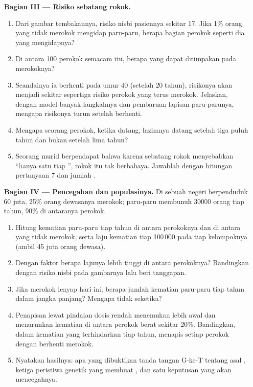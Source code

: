 \begin{problem}
\medskip
\noindent\textbf{Bagian III --- Risiko sebatang rokok.}
\begin{enumerate}[resume]
  \item Dari gambar tembakaunya, risiko nisbi pasiennya sekitar 17.
        Jika 1\% orang yang tidak merokok mengidap  paru-paru,
        berapa bagian perokok seperti dia yang mengidapnya?
  \item Di antara 100 perokok semacam itu, berapa  yang dapat
        ditimpakan pada merokoknya?
  \item Seandainya ia berhenti pada umur 40 (setelah 20 tahun),
        risikonya akan menjadi sekitar sepertiga risiko perokok yang
        terus merokok. Jelaskan, dengan model banyak langkahnya dan
        pembaruan lapisan paru-parunya, mengapa risikonya turun setelah
        berhenti.
  \item Mengapa  seorang perokok, ketika datang, lazimnya datang
        setelah tiga puluh tahun dan bukan setelah lima tahun?
  \item Seorang murid berpendapat bahwa karena sebatang rokok
        menyebabkan ``hanya satu  tiap '', rokok itu tak
        berbahaya. Jawablah dengan hitungan pertanyaan 7 dan jumlah .
\end{enumerate}

\medskip
\noindent\textbf{Bagian IV --- Pencegahan dan populasinya.}
Di sebuah negeri berpenduduk 60 juta, 25\% orang dewasanya merokok;
 paru-paru membunuh $\num{30000}$ orang tiap tahun, 90\% di
antaranya perokok.
\begin{enumerate}[resume]
  \item Hitung kematian  paru-paru tiap tahun di antara
        perokoknya dan di antara yang tidak merokok, serta laju
        kematian tiap 100\,000 pada tiap kelompoknya (ambil 45 juta
        orang dewasa).
  \item Dengan faktor berapa lajunya lebih tinggi di antara
        perokoknya? Bandingkan dengan risiko nisbi pada gambarnya lalu
        beri tanggapan.
  \item Jika merokok lenyap hari ini, berapa jumlah kematian 
        paru-paru tiap tahun dalam jangka panjang? Mengapa tidak seketika?
  \item Penapisan lewat pindaian dosis rendah menemukan  lebih
        awal dan menurunkan kematian di antara perokok berat sekitar
        20\%. Bandingkan, dalam kematian yang terhindarkan tiap tahun,
        menapis setiap perokok dengan berhenti merokok.
  \item Nyatakan hasilnya: apa yang dibuktikan tanda tangan G-ke-T
        tentang asal  , ketiga peristiwa genetik yang
        membuat , dan satu keputusan yang akan mencegahnya.
\end{enumerate}
\end{problem}

